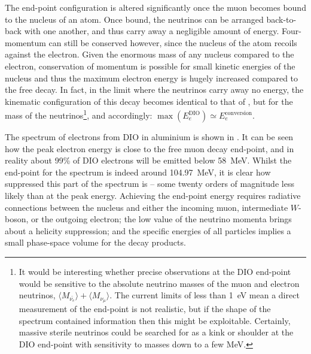 The end-point configuration is altered significantly once the muon becomes bound to the nucleus of an atom.
Once bound, the neutrinos can be arranged back-to-back with one another, and thus carry away a negligible amount of energy.
Four-momentum can still be conserved however, since the nucleus of the atom recoils against the electron.  
Given the enormous mass of any nucleus compared to the electron, conservation of momentum is possible for small kinetic energies of the nucleus and thus the maximum electron energy is hugely increased compared to the free decay.
In fact, in the limit where the neutrinos carry away no energy, the kinematic configuration of this decay becomes identical to that of \mueconv, but for the mass of the neutrinos\footnote{
It would be interesting whether precise observations at the DIO end-point would be sensitive to the absolute neutrino masses of the muon and electron neutrinos, $\langle M_{\bar{\nu_{e}}}\rangle+\langle M_{\nu_{\mu}}\rangle$.
The current limits of less than 1~eV mean a direct measurement of the end-point is not realistic, but if the shape of the spectrum contained information then this might be exploitable.
Certainly, massive sterile neutrinos could be searched for as a kink or shoulder at the DIO end-point with sensitivity to masses down to a few MeV.
}, and accordingly: $\max(E_{e}^\textrm{DIO})\simeq{}E_{e}^\textrm{conversion}$.
\FigDecayInOrbitSpectrum

The spectrum of electrons from \ac{DIO} in aluminium is shown in .
It can be seen how the peak electron energy is close to the free muon decay end-point, and in reality about 99\% of \ac{DIO} electrons will be emitted below 58~MeV.
Whilst the end-point for the spectrum is indeed around 104.97~MeV, it is clear how suppressed this part of the spectrum is -- some twenty orders of magnitude less likely than at the peak energy.
Achieving the end-point energy requires radiative connections between the nucleus and either the incoming muon, intermediate $W$-boson, or the outgoing electron; the low value of the neutrino momenta brings about a helicity suppression; and the specific energies of all particles implies a small phase-space volume for the decay products.

